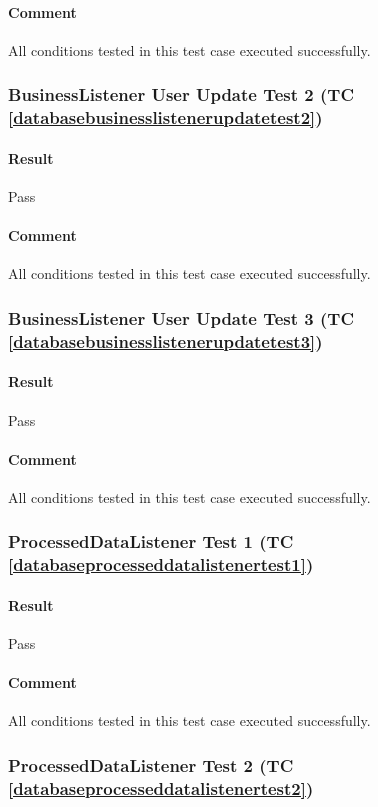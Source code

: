 \documentclass[hidelinks,english]{article}
\begin{document}
				\paragraph{Comment} All conditions tested in this test case executed successfully.
				
			\subsubsection{BusinessListener User Update Test 2 (TC \ref{databasebusinesslistenerupdatetest2})}
				\paragraph{Result} Pass
				\paragraph{Comment} All conditions tested in this test case executed successfully.
				
			\subsubsection{BusinessListener User Update Test 3 (TC \ref{databasebusinesslistenerupdatetest3})}
				\paragraph{Result} Pass
				\paragraph{Comment} All conditions tested in this test case executed successfully.
			
			\subsubsection{ProcessedDataListener Test 1 (TC \ref{databaseprocesseddatalistenertest1})}
				\paragraph{Result} Pass
				\paragraph{Comment} All conditions tested in this test case executed successfully.
			
			\subsubsection{ProcessedDataListener Test 2 (TC \ref{databaseprocesseddatalistenertest2})}
\end{document}
